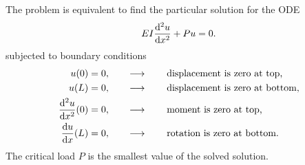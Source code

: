 \begin{solution}
The problem is equivalent to find the particular solution for the ODE
\begin{gather*}
EI\dfrac{\mathrm{d}^2u}{\mathrm{d}x^2}+Pu=0.
\end{gather*}
subjected to boundary conditions
\begin{align*}
u(0)&=0,\qquad\longrightarrow\qquad\text{displacement is zero at top,}\\
u(L)&=0,\qquad\longrightarrow\qquad\text{displacement is zero at bottom,}\\
\dfrac{\mathrm{d}^2u}{\mathrm{d}x^2}(0)&=0,\qquad\longrightarrow\qquad\text{moment is zero at top,}\\
\dfrac{\mathrm{d}u}{\mathrm{d}x}(L)&=0,\qquad\longrightarrow\qquad\text{rotation is zero at bottom}.
\end{align*}
The critical load $P$ is the smallest value of the solved solution.


\end{solution}
